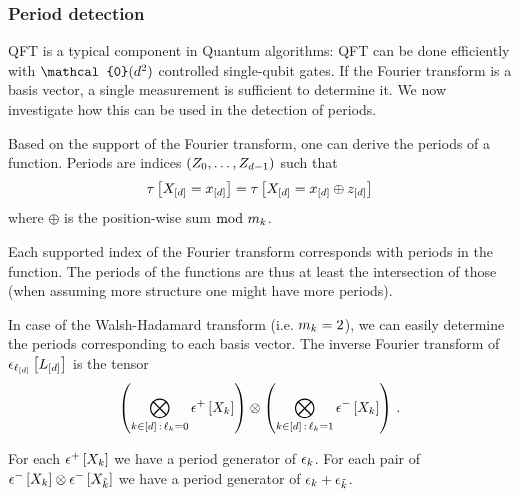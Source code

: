 \subsubsection{Period detection}

QFT is a typical component in Quantum algorithms: QFT can be done efficiently with $\mathcal{0}(\catorder^2)$ controlled single-qubit gates.
If the Fourier transform is a basis vector, a single measurement is sufficient to determine it.
We now investigate how this can be used in the detection of periods.


Based on the support of the Fourier transform, one can derive the periods of a function.
Periods are indices $(Z_{0},\ldots,Z_{d-1})$ such that
\begin{align*}
    \tau\left[X_{[d]}=x_{[d]}\right]
    = \tau\left[X_{[d]}=x_{[d]}\oplus z_{[d]}\right]
\end{align*}
where $\oplus$ is the position-wise sum $\mathrm{mod}\,\,m_{k}$.


Each supported index of the Fourier transform corresponds with periods in the function.
The periods of the functions are thus at least the intersection of those (when assuming more structure one might have more periods).

In case of the Walsh-Hadamard transform (i.e. $m_{k}=2$), we can easily determine the periods corresponding to each basis vector.
The inverse Fourier transform of $\epsilon_{\ell_{[d]}}\left[L_{[d]}\right]$ is the tensor
\begin{align*}
    \left(\bigotimes_{k\in[d] \,:\, \ell_{k}=0} \epsilon^{+}\left[X_{k}\right] \right)
    \otimes
    \left(\bigotimes_{k\in[d] \,:\, \ell_{k}=1} \epsilon^{-}\left[X_{k}\right] \right) \, .
\end{align*}

For each $\epsilon^{+}\left[X_{k}\right]$ we have a period generator of $\epsilon_{k}$.
For each pair of $\epsilon^{-}\left[X_{k}\right]\otimes \epsilon^{-}\left[X_{\tilde{k}}\right]$ we have a period generator of $\epsilon_{k}+\epsilon_{\tilde{k}}$.

